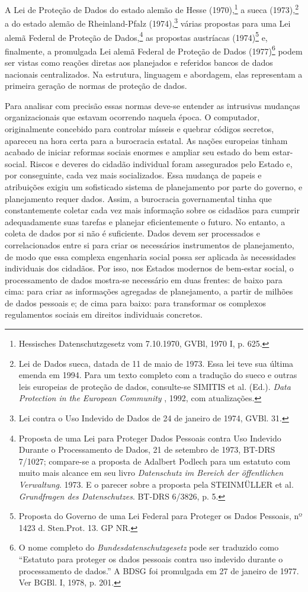 A Lei de Proteção de Dados do estado alemão de Hesse (1970),\footnote{Hessisches
  Datenschutzgesetz vom 7.10.1970, GVBl, 1970 I, p. 625.} a sueca
(1973),\footnote{Lei de Dados sueca, datada de 11 de maio de 1973. Essa
  lei teve sua última emenda em 1994. Para um texto completo com a
  tradução do sueco e outras leis europeias de proteção de dados,
  consulte-se SIMITIS et al. (Ed.). \emph{Data Protection in the
  European Community} , 1992, com atualizações.} a do estado alemão de
Rheinland-Pfalz (1974),\footnote{Lei contra o Uso Indevido de Dados de
  24 de janeiro de 1974, GVBl. 31.} várias propostas para uma Lei alemã
Federal de Proteção de Dados,\footnote{Proposta de uma Lei para Proteger
  Dados Pessoais contra Uso Indevido Durante o Processamento de Dados,
  21 de setembro de 1973, BT-DRS 7/1027; compare-se a proposta de
  Adalbert Podlech para um estatuto com muito mais alcance em seu livro
  \emph{Datenschutz im Bereich der öffentlichen Verwaltung}. 1973. E o
  parecer sobre a proposta pela STEINMÜLLER et al. \emph{Grundfragen des
  Datenschutzes}. BT-DRS 6/3826, p. 5.} as propostas austríacas
(1974)\footnote{Proposta do Governo de uma Lei Federal para Proteger os
  Dados Pessoais, nº 1423 d. Sten.Prot. 13. GP NR.} e, finalmente, a
promulgada Lei alemã Federal de Proteção de Dados (1977)\footnote{O nome
  completo do \emph{Bundesdatenschutzgesetz} pode ser traduzido como
  ``Estatuto para proteger os dados pessoais contra uso indevido durante
  o processamento de dados.'' A BDSG foi promulgada em 27 de janeiro de
  1977. Ver BGBl. I, 1978, p. 201.} podem ser vistas como reações
diretas aos planejados e referidos bancos de dados nacionais
centralizados. Na estrutura, linguagem e abordagem, elas representam a
primeira geração de normas de proteção de dados.

Para analisar com precisão essas normas deve-se entender as intrusivas
mudanças organizacionais que estavam ocorrendo naquela época. O
computador, originalmente concebido para controlar mísseis e quebrar
códigos secretos, apareceu na hora certa para a burocracia estatal. As
nações europeias tinham acabado de iniciar reformas sociais enormes e
ampliar seu estado do bem estar-social. Riscos e deveres do cidadão
individual foram assegurados pelo Estado e, por conseguinte, cada vez
mais socializados. Essa mudança de papeis e atribuições exigiu um
sofisticado sistema de planejamento por parte do governo, e planejamento
requer dados. Assim, a burocracia governamental tinha que constantemente
coletar cada vez mais informação sobre os cidadãos para cumprir
adequadamente suas tarefas e planejar eficientemente o futuro. No
entanto, a coleta de dados por si não é suficiente. Dados devem ser
processados e correlacionados entre si para criar os necessários
instrumentos de planejamento, de modo que essa complexa engenharia
social possa ser aplicada às necessidades individuais dos cidadãos. Por
isso, nos Estados modernos de bem-estar social, o processamento de dados
mostra-se necessário em duas frentes: de baixo para cima: para criar as
informações agregadas de planejamento, a partir de milhões de dados
pessoais e; de cima para baixo: para transformar os complexos
regulamentos sociais em direitos individuais concretos.

